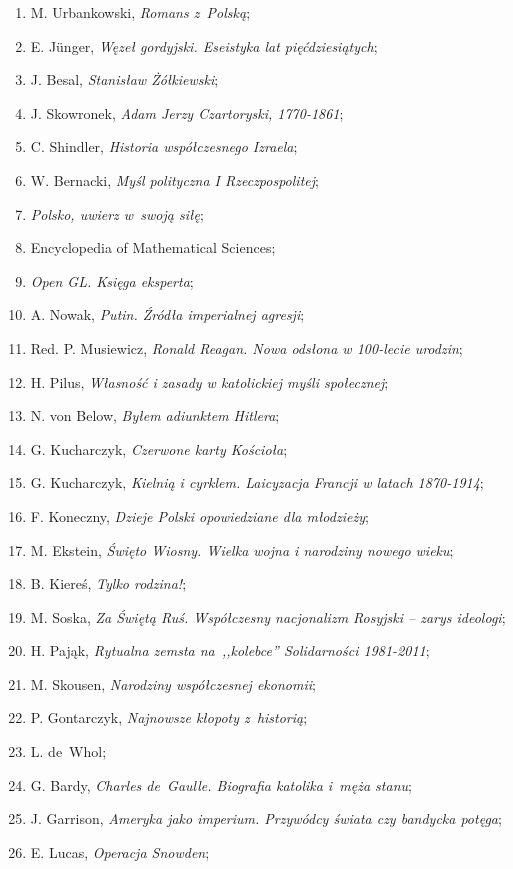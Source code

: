 \documentclass[a4paper,11pt]{article}
\begin{document}
\begin{enumerate}
{    polskiej opozycji 1976-1989};
\item M. Urbankowski, \emph{Romans z~Polską};
\item E. J\"{u}nger, \emph{Węzeł gordyjski. Eseistyka lat
    pięćdziesiątych};
\item J. Besal, \emph{Stanisław Żółkiewski};
\item J. Skowronek, \emph{Adam Jerzy Czartoryski, 1770-1861};
\item C. Shindler, \emph{Historia współczesnego Izraela};
\item W. Bernacki, \emph{Myśl polityczna I Rzeczpospolitej};
\item \emph{Polsko, uwierz w~swoją siłę};
\item Encyclopedia of Mathematical Sciences;
\item \emph{Open GL. Księga eksperta};
\item A. Nowak, \emph{Putin. Źródła imperialnej agresji};
\item Red. P. Musiewicz, \emph{Ronald Reagan. Nowa odsłona w 100-lecie
    urodzin};
\item H. Pilus, \emph{Własność i zasady w katolickiej myśli
    społecznej};
\item N. von Below, \emph{Byłem adiunktem Hitlera};
\item G. Kucharczyk, \emph{Czerwone karty Kościoła};
\item G. Kucharczyk, \emph{Kielnią i cyrklem. Laicyzacja Francji w
    latach 1870-1914};
\item F. Koneczny, \emph{Dzieje Polski opowiedziane dla młodzieży};
\item M. Ekstein, \emph{Święto Wiosny. Wielka wojna i narodziny nowego
    wieku};
\item B. Kiereś, \emph{Tylko rodzina!};
\item M. Soska, \emph{Za Świętą Ruś. Współczesny nacjonalizm Rosyjski
    -- zarys ideologi};
\item H. Pająk, \emph{Rytualna zemsta na~,,kolebce'' Solidarności
    1981-2011};
\item M. Skousen, \emph{Narodziny współczesnej ekonomii};
\item P. Gontarczyk, \emph{Najnowsze kłopoty z~historią};
\item L. de~Whol;
\item G. Bardy, \emph{Charles de~Gaulle. Biografia katolika i~męża
    stanu};
\item J. Garrison, \emph{Ameryka jako imperium. Przywódcy świata czy
    bandycka potęga};
\item E. Lucas, \emph{Operacja Snowden};

\end{enumerate}
\end{document}
